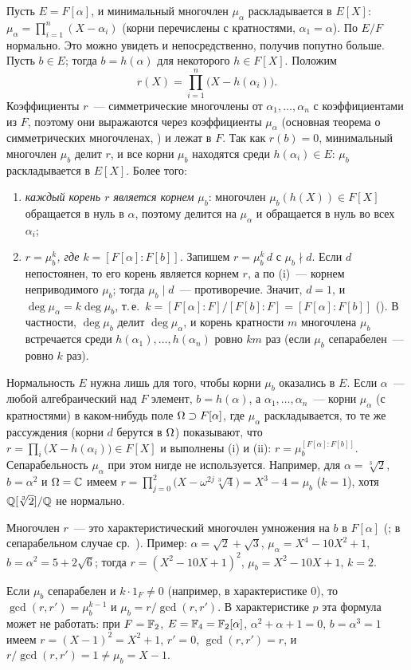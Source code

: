 \begin{example}
Пусть $E=F[\alpha]$, и минимальный многочлен $\mu_\alpha$ раскладывается в $E[X]$: $\mu_\alpha=\prod_{i=1}^n(X-\alpha_i)$
(корни перечислены с кратностями, $\alpha_1=\alpha$). По  $E/F$ нормально. Это можно увидеть и непосредственно,
получив попутно больше. Пусть $b\in E$; тогда $b=h(\alpha)$ для некоторого $h\in F[X]$. Положим
\[
r(X)=\prod_{i=1}^n\bigl(X-h(\alpha_i)\bigr).
\]
Коэффициенты $r$~--- симметрические многочлены от $\alpha_1,\dots,\alpha_n$ с коэффициентами из $F$, поэтому они выражаются
через коэффициенты $\mu_\alpha$ (основная теорема о симметрических многочленах, ) и лежат в $F$. Так как
$r(b)=0$, минимальный многочлен $\mu_b$ делит $r$, и все корни $\mu_b$ находятся среди $h(\alpha_i)\in E$: $\mu_b$
раскладывается в $E[X]$. Более того:
\begin{enumerate}[label=\textup{(\roman*)}]
\item \emph{каждый корень $r$ является корнем $\mu_b$}: многочлен $\mu_b(h(X))\in F[X]$ обращается в нуль в $\alpha$, поэтому
делится на $\mu_\alpha$ и обращается в нуль во всех $\alpha_i$;
\item \emph{$r=\mu_b^k$, где $k=[F[\alpha]:F[b]]$.} Запишем $r=\mu_b^k\,d$ с $\mu_b\nmid d$. Если $d$ непостоянен, то его корень
является корнем $r$, а по (i)~--- корнем неприводимого $\mu_b$; тогда $\mu_b\mid d$~--- противоречие. Значит, $d=1$, и
$\deg\mu_\alpha=k\deg\mu_b$, т.\,е.\ $k=[F[\alpha]:F]/[F[b]:F]=[F[\alpha]:F[b]]$ (). В частности, $\deg\mu_b$ делит
$\deg\mu_\alpha$, и корень кратности $m$ многочлена $\mu_b$ встречается среди $h(\alpha_1),\dots,h(\alpha_n)$ ровно $km$ раз (если
$\mu_b$ сепарабелен~--- ровно $k$ раз).
\end{enumerate}
Нормальность $E$ нужна лишь для того, чтобы корни $\mu_b$ оказались в $E$. Если $\alpha$~--- любой алгебраический над $F$
элемент, $b=h(\alpha)$, а $\alpha_1,\dots,\alpha_n$~--- корни $\mu_\alpha$ (с кратностями) в каком-нибудь поле $\Omega\supset F[\alpha]$,
где $\mu_\alpha$ раскладывается, то те же рассуждения (корни $d$ берутся в $\Omega$) показывают, что
$r=\prod_i\bigl(X-h(\alpha_i)\bigr)\in F[X]$ и выполнены (i) и (ii): $r=\mu_b^{[F[\alpha]:F[b]]}$. Сепарабельность $\mu_\alpha$ при
этом нигде не используется. Например, для $\alpha=\sqrt[3]2$, $b=\alpha^2$ и $\Omega=\mathbb C$ имеем
$r=\prod_{j=0}^{2}\bigl(X-\omega^{2j}\sqrt[3]4\bigr)=X^3-4=\mu_b$ ($k=1$), хотя $\mathbb Q[\sqrt[3]2]/\mathbb Q$ не нормально.

Многочлен $r$~--- это характеристический многочлен умножения на $b$ в $F[\alpha]$ (; в сепарабельном случае ср.\ ). Пример: $\alpha=\sqrt2+\sqrt3$,
$\mu_\alpha=X^4-10X^2+1$, $b=\alpha^2=5+2\sqrt6$; тогда $r=(X^2-10X+1)^2$, $\mu_b=X^2-10X+1$, $k=2$.

Если $\mu_b$ сепарабелен и $k\cdot1_F\ne0$ (например, в характеристике $0$), то $\gcd(r,r')=\mu_b^{k-1}$ и
$\mu_b=r/\gcd(r,r')$. В характеристике $p$ эта формула может не работать: при $F=\mathbb F_2$, $E=\mathbb F_4=\mathbb F_2[\alpha]$,
$\alpha^2+\alpha+1=0$, $b=\alpha^3=1$ имеем $r=(X-1)^2=X^2+1$, $r'=0$, $\gcd(r,r')=r$, и $r/\gcd(r,r')=1\ne\mu_b=X-1$.
\end{example}

